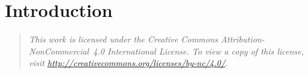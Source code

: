 \newcommand{\novathesis}{\emph{novathesis}}
\newcommand{\novathesisclass}{\texttt{novathesis.cls}}


\chapter{Introduction}
\label{cha:introduction}

\begin{quotation}
  \itshape
  This work is licensed under the Creative Commons Attribution-NonCommercial~4.0 International License.
  To view a copy of this license, visit \url{http://creativecommons.org/licenses/by-nc/4.0/}.
\end{quotation}

%
%
% 
%
%
%
%


